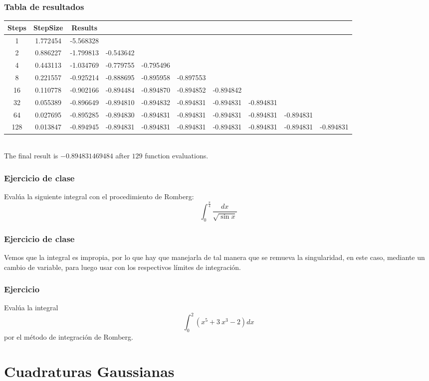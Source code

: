 \begin{frame}
\frametitle{Tabla de resultados}
\fontsize{6}{6}\selectfont
\begin{tabular}{c c c c c c c c c c}
 Steps	&	StepSize	&	Results	 \\ \hline							
     1	&	1.772454	&	-5.568328 \\ \hline 
     2	&	0.886227	&	-1.799813	&	-0.543642 \\ \hline
     4	&	0.443113	&	-1.034769	&	-0.779755	&	-0.795496 \\ \hline
     8	&	0.221557	&	-0.925214	&	-0.888695	&	-0.895958	&	-0.897553 \\ \hline
    16	&	0.110778	&	-0.902166	&	-0.894484	&	-0.894870	&	-0.894852	&	-0.894842 \\ \hline
    32	&	0.055389	&	-0.896649	&	-0.894810	&	-0.894832	&	-0.894831	&	-0.894831	&	-0.894831 \\ \hline
    64	&	0.027695	&	-0.895285	&	-0.894830	&	-0.894831	&	-0.894831	&	-0.894831	&	-0.894831	&	-0.894831 \\ \hline
   128	&	0.013847	&	-0.894945	&	-0.894831	&	-0.894831	&	-0.894831	&	-0.894831	&	-0.894831	&	-0.894831	&	-0.894831 
\end{tabular}
\\
\bigskip
\fontsize{12}{12}\selectfont
The final result is $-0.894831469484$ after $129$ function evaluations.
\end{frame}
\begin{frame}
\frametitle{Ejercicio de clase}
Evalúa la siguiente integral con el procedimiento de Romberg:
\[ \int_{0}^{\frac{\pi}{4}} \dfrac{dx}{\sqrt{\sin x}} \]
\end{frame}
\begin{frame}
\frametitle{Ejercicio de clase}
Vemos que la integral es impropia, por lo que hay que manejarla de tal manera que se remueva la singularidad, en este caso, mediante un cambio de variable, para luego usar  con los respectivos límites de integración.
\end{frame}
\begin{frame}
\frametitle{Ejercicio}
Evalúa la integral
\[ \int_{0}^{2} (x^{5} + 3 \: x^{3} - 2) dx\]
por el método de integración de Romberg.
\end{frame}
\section{Cuadraturas Gaussianas}
